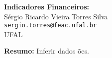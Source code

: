 \documentclass[12pt,a4paper]{article}
\begin{document}
	
	\begin{center}
		\LARGE \textbf{Indicadores Financeiros:   } \\[1cm]
		
		\large
		Sérgio Ricardo Vieira Torres Silva\\
		\texttt{sergio.torres@feac.ufal.br}\\
		UFAL\\[0.5cm]
		
		
	\end{center}
	
	\vspace{1cm}
	
	\noindent \textbf{Resumo:} Inferir dados ões.
	
\end{document}
